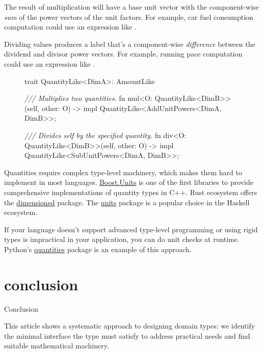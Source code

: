 \documentclass{article}
\begin{document}
The result of multiplication will have a base unit vector with the component-wise \emph{sum} of the power vectors of the unit factors.
For example, car fuel consumption computation could use an expression like .

Dividing values produces a label that's a component-wise \emph{difference} between the dividend and divisor power vectors.
For example, running pace computation could use an expression like .

\begin{figure}
\begin{code}
trait QuantityLike<DimA>: AmountLike {
  \emph{/// Multiplies two quantities.}
  fn mul<O: QuantityLike<DimB>>(self, other: O)
    -> impl QuantityLike<AddUnitPowers<DimA, DimB>>;

  \emph{/// Divides self by the specified quantity.}
  fn div<O: QuantityLike<DimB>>(self, other: O)
    -> impl QuantityLike<SubUnitPowers<DimA, DimB>>;
}
\end{code}
\end{figure}

Quantities require complex type-level machinery, which makes them hard to implement in most languages.
\href{https://www.boost.org/doc/libs/1_65_0/doc/html/boost_units.html}{Boost.Units} is one of the first libraries to provide comprehensive implementations of quantity types in C++.
Rust ecosystem offers the \href{https://crates.io/crates/dimensioned}{dimensioned} package.
The \href{https://hackage.haskell.org/package/units}{units} package is a popular choice in the Haskell ecosystem.

If your language doesn't support advanced type-level programming or using rigid types is impractical in your application, you can do unit checks at runtime.
Python's \href{https://github.com/python-quantities/python-quantities}{quantities} package is an example of this approach.

\section{conclusion}{Conclusion}

This article shows a systematic approach to designing domain types: we identify the minimal interface the type must satisfy to address practical needs and find suitable mathematical machinery.
\end{document}
